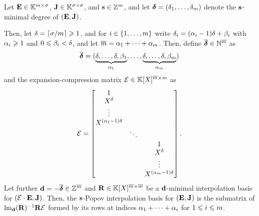 \documentclass[preprint]{sig-alternate-05-2015}
\begin{document}
\begin{lem}
  \label{lem:known_mindeg_pib}
  Let $\evMat \in \matSpace[\rdim][\order]$, $\mulmat \in \matSpace[\order]$,
  and $\shifts \in \shiftSpace$, and let $\minDegs =
  (\minDeg_1,\ldots,\minDeg_\rdim)$ denote the $\shifts$-minimal degree of
  $(\evMat,\mulmat)$. 

  Then, let $\degExp = \lceil \order / \rdim \rceil \ge 1$, and for
  $i\in\{1,\ldots,\rdim\}$ write $\minDeg_i = (\quoExp_i -1) \degExp +
  \remExp_i$ with $\quoExp_i \ge 1$ and $0 \le \remExp_i < \degExp$, and let
  $\expand{\rdim} = \quoExp_1 + \cdots + \quoExp_\rdim$. Then, define
  $\expand{\minDegs}\in \NN^{\expand{\rdim}}$ as
  \begin{equation}
    \label{eqn:expandMinDegs}
    \expand{\minDegs} = ( \underbrace{\degExp, \ldots, \degExp, \remExp_1}_{\quoExp_1}, \ldots,
    \underbrace{\degExp, \ldots, \degExp, \remExp_\rdim}_{\quoExp_\rdim} )
  \end{equation}
  and the expansion-compression matrix $\expandMat \in
  \polMatSpace[\expand{\rdim}][\rdim]$ as
  \begin{equation}
    \label{eqn:expandMat}
    \expandMat = 
    \begin{bmatrix}
      1 \\
      X^\degExp \\
      \vdots \\
      X^{(\quoExp_1-1)\degExp} \\
      & \ddots \\
      & & 1 \\
      & & X^\degExp \\
      & & \vdots \\
      & & X^{(\quoExp_\rdim-1)\degExp}
    \end{bmatrix}. 
  \end{equation}
  Let further $\shifts[d] = - \expand{\minDegs} \in
  \shiftSpace[\expand{\rdim}]$ and $\mat{R} \in \polMatSpace[\expand{\rdim}]$
  be a $\shifts[d]$-minimal interpolation basis for $(\expandMat \mul \evMat,
  \mulmat)$. Then, the $\shifts$-Popov interpolation basis for
  $(\evMat,\mulmat)$ is the submatrix of
  $\leadingMat[{\shifts[d]}]{\mat{R}}^{-1} \mat{R} \expandMat$ formed by its
  rows at indices $\quoExp_1+\cdots+\quoExp_i$ for $1\le i\le \rdim$.
\end{lem}
\end{document}
